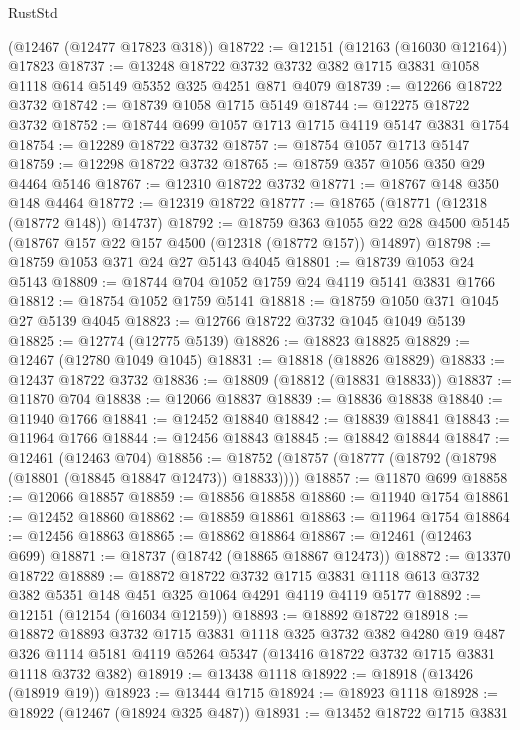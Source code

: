 \begin{lexlean}{RustStd}
\begin{coremodule}
    (@12467 (@12477 @17823 @318))
@18722 := @12151 (@12163 (@16030 @12164)) @17823
@18737 := @13248
    @18722
    @3732
    @3732
    @382
    @1715
    @3831
    @1058
    @1118
    @614
    @5149
    @5352
    @325
    @4251
    @871
    @4079
@18739 := @12266 @18722 @3732
@18742 := @18739 @1058 @1715 @5149
@18744 := @12275 @18722 @3732
@18752 := @18744 @699 @1057 @1713 @1715 @4119 @5147 @3831 @1754
@18754 := @12289 @18722 @3732
@18757 := @18754 @1057 @1713 @5147
@18759 := @12298 @18722 @3732
@18765 := @18759 @357 @1056 @350 @29 @4464 @5146
@18767 := @12310 @18722 @3732
@18771 := @18767 @148 @350 @148 @4464
@18772 := @12319 @18722
@18777 := @18765 (@18771 (@12318 (@18772 @148)) @14737)
@18792 := @18759
    @363
    @1055
    @22
    @28
    @4500
    @5145
    (@18767 @157 @22 @157 @4500 (@12318 (@18772 @157)) @14897)
@18798 := @18759 @1053 @371 @24 @27 @5143 @4045
@18801 := @18739 @1053 @24 @5143
@18809 := @18744 @704 @1052 @1759 @24 @4119 @5141 @3831 @1766
@18812 := @18754 @1052 @1759 @5141
@18818 := @18759 @1050 @371 @1045 @27 @5139 @4045
@18823 := @12766 @18722 @3732 @1045 @1049 @5139
@18825 := @12774 (@12775 @5139)
@18826 := @18823 @18825
@18829 := @12467 (@12780 @1049 @1045)
@18831 := @18818 (@18826 @18829)
@18833 := @12437 @18722 @3732
@18836 := @18809 (@18812 (@18831 @18833))
@18837 := @11870 @704
@18838 := @12066 @18837
@18839 := @18836 @18838
@18840 := @11940 @1766
@18841 := @12452 @18840
@18842 := @18839 @18841
@18843 := @11964 @1766
@18844 := @12456 @18843
@18845 := @18842 @18844
@18847 := @12461 (@12463 @704)
@18856 := @18752 (@18757 (@18777 (@18792 (@18798 (@18801 (@18845 @18847 @12473)) @18833))))
@18857 := @11870 @699
@18858 := @12066 @18857
@18859 := @18856 @18858
@18860 := @11940 @1754
@18861 := @12452 @18860
@18862 := @18859 @18861
@18863 := @11964 @1754
@18864 := @12456 @18863
@18865 := @18862 @18864
@18867 := @12461 (@12463 @699)
@18871 := @18737 (@18742 (@18865 @18867 @12473))
@18872 := @13370 @18722
@18889 := @18872
    @18722
    @3732
    @1715
    @3831
    @1118
    @613
    @3732
    @382
    @5351
    @148
    @451
    @325
    @1064
    @4291
    @4119
    @4119
    @5177
@18892 := @12151 (@12154 (@16034 @12159))
@18893 := @18892 @18722
@18918 := @18872
    @18893
    @3732
    @1715
    @3831
    @1118
    @325
    @3732
    @382
    @4280
    @19
    @487
    @326
    @1114
    @5181
    @4119
    @5264
    @5347
    (@13416 @18722 @3732 @1715 @3831 @1118 @3732 @382)
@18919 := @13438 @1118
@18922 := @18918 (@13426 (@18919 @19))
@18923 := @13444 @1715
@18924 := @18923 @1118
@18928 := @18922 (@12467 (@18924 @325 @487))
@18931 := @13452 @18722 @1715 @3831

\end{coremodule}
\end{lexlean}
